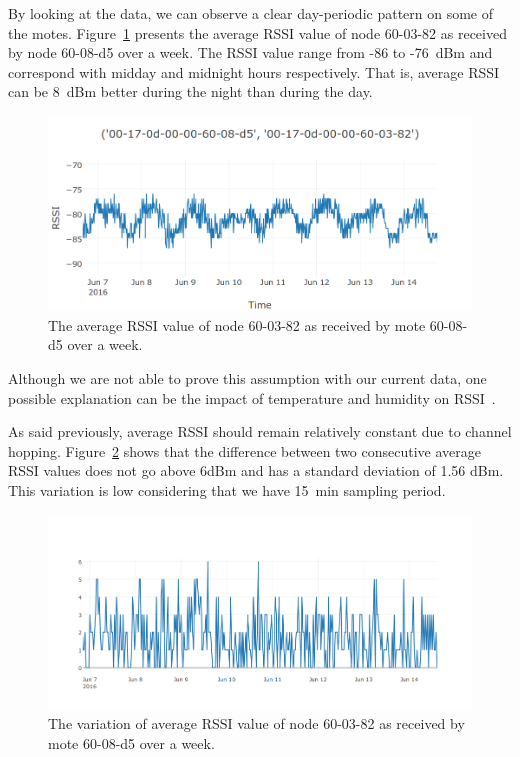 \documentclass{sig-alternate}
\begin{document}

By looking at the data, we can observe a clear day-periodic pattern on some of the motes.
Figure~\ref{fig:periodic_rssi} presents the average RSSI value of node 60-03-82 as received by node 60-08-d5 over a week.
The RSSI value range from -86 to -76~dBm and correspond with midday and midnight hours respectively.
That is, average RSSI can be 8~dBm better during the night than during the day.

\begin{figure}
    \centering
    \includegraphics[width=\columnwidth]{periodic_rssi}
    \caption{The average RSSI value of node 60-03-82 as received by mote 60-08-d5 over a week.}
    \label{fig:periodic_rssi}
\end{figure}

Although we are not able to prove this assumption with our current data, one possible explanation can be the impact of temperature and humidity on RSSI~\cite{luomala15effects}.


As said previously, average RSSI should remain relatively constant due to channel hopping.
Figure~\ref{fig:rssi_variation} shows that the difference between two consecutive average RSSI values does not go above 6dBm and has a standard deviation of 1.56 dBm.
This variation is low considering that we have 15~min sampling period.

\begin{figure}
    \centering
    \includegraphics[width=\columnwidth]{rssi_variation}
    \caption{The variation of average RSSI value of node 60-03-82 as received by mote 60-08-d5 over a week.}
    \label{fig:rssi_variation}
\end{figure}
\end{document}
